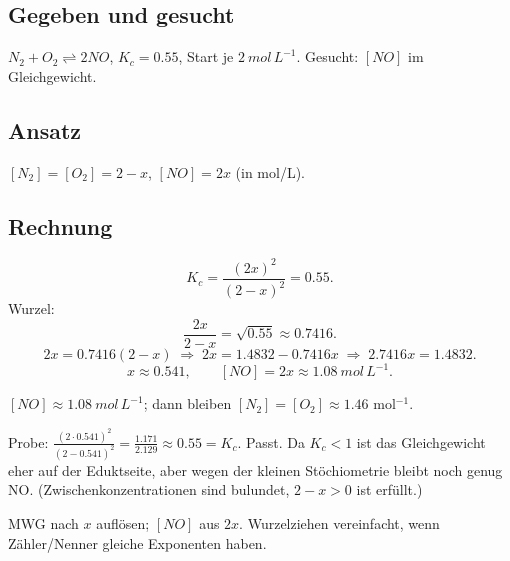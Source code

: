 
\subsection*{Gegeben und gesucht}
$N_2 + O_2 \rightleftharpoons 2NO$, $K_c = 0.55$, Start je $2\ mol\,L^{-1}$.
Gesucht: $[NO]$ im Gleichgewicht.

\subsection*{Ansatz}
$[N_2]=[O_2] = 2-x$, $[NO] = 2x$ (in mol/L).

\subsection*{Rechnung}
\[
  K_c = \frac{(2x)^2}{(2-x)^2} = 0.55 .
\]
Wurzel:
\[
  \frac{2x}{2-x} = \sqrt{0.55} \approx 0.7416 .
\]
\[
  2x = 0.7416(2-x)
  \;\Rightarrow\; 2x = 1.4832 - 0.7416 x
  \;\Rightarrow\; 2.7416 x = 1.4832 .
\]
\[
  x \approx 0.541,\qquad [NO] = 2x \approx 1.08\ mol\,L^{-1}.
\]

\begin{ergebnis}
$[NO] \approx 1.08\ mol\,L^{-1}$; dann bleiben $[N_2]=[O_2]\approx1.46$
mol$^{-1}$.
\end{ergebnis}

\begin{kontrolle}
Probe: $\frac{(2\cdot0.541)^2}{(2-0.541)^2}
= \frac{1.171}{2.129} \approx 0.55 = K_c$. Passt. Da $K_c<1$ ist das
Gleichgewicht eher auf der Eduktseite, aber wegen der kleinen
Stöchiometrie bleibt noch genug NO. (Zwischenkonzentrationen sind bulundet,
$2-x>0$ ist erfüllt.)
\end{kontrolle}

\begin{merksatz}
MWG nach $x$ auflösen; $[NO]$ aus $2x$. Wurzelziehen vereinfacht, wenn
Zähler/Nenner gleiche Exponenten haben.
\end{merksatz}
